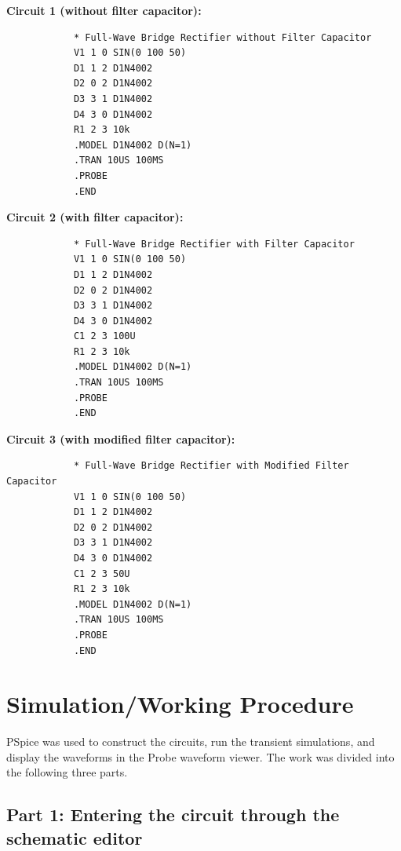 \documentclass[12pt,a4paper]{article}
\begin{document}
	\textbf{Circuit 1 (without filter capacitor):}
	{\small
		\begin{verbatim}
			* Full-Wave Bridge Rectifier without Filter Capacitor
			V1 1 0 SIN(0 100 50)
			D1 1 2 D1N4002
			D2 0 2 D1N4002
			D3 3 1 D1N4002
			D4 3 0 D1N4002
			R1 2 3 10k
			.MODEL D1N4002 D(N=1)
			.TRAN 10US 100MS
			.PROBE
			.END
	\end{verbatim}}
	
	\textbf{Circuit 2 (with filter capacitor):}
	{\small
		\begin{verbatim}
			* Full-Wave Bridge Rectifier with Filter Capacitor
			V1 1 0 SIN(0 100 50)
			D1 1 2 D1N4002
			D2 0 2 D1N4002
			D3 3 1 D1N4002
			D4 3 0 D1N4002
			C1 2 3 100U
			R1 2 3 10k
			.MODEL D1N4002 D(N=1)
			.TRAN 10US 100MS
			.PROBE
			.END
	\end{verbatim}}
	
	\textbf{Circuit 3 (with modified filter capacitor):}
	{\small
		\begin{verbatim}
			* Full-Wave Bridge Rectifier with Modified Filter Capacitor
			V1 1 0 SIN(0 100 50)
			D1 1 2 D1N4002
			D2 0 2 D1N4002
			D3 3 1 D1N4002
			D4 3 0 D1N4002
			C1 2 3 50U
			R1 2 3 10k
			.MODEL D1N4002 D(N=1)
			.TRAN 10US 100MS
			.PROBE
			.END
	\end{verbatim}}
	
	\section{Simulation/Working Procedure}
	
	PSpice was used to construct the circuits, run the transient simulations, and display the waveforms in the Probe waveform viewer. The work was divided into the following three parts.
	
	\subsection*{Part 1: Entering the circuit through the schematic editor}
	
\end{document}
